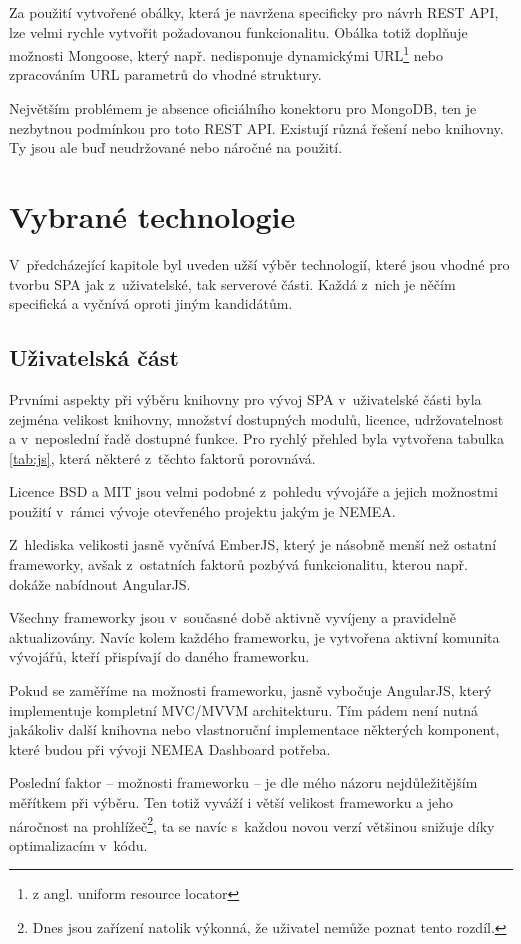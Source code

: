Za použití vytvořené obálky, která je navržena specificky pro návrh REST API, lze velmi rychle vytvořit požadovanou funkcionalitu. Obálka totiž doplňuje možnosti Mongoose, který např. nedisponuje dynamickými URL\footnote{z angl. uniform resource locator} nebo zpracováním URL parametrů do vhodné struktury.

Největším problémem je absence oficiálního konektoru pro MongoDB, ten je nezbytnou podmínkou pro toto REST API. Existují různá řešení nebo knihovny. Ty jsou ale buď neudržované nebo náročné na použití.

\section{Vybrané technologie}

V~předcházející kapitole byl uveden užší výběr technologií, které jsou vhodné pro tvorbu SPA jak z~uživatelské, tak serverové části. Každá z~nich je něčím specifická a vyčnívá oproti jiným kandidátům.

\subsection{Uživatelská část}

Prvními aspekty při výběru knihovny pro vývoj SPA v~uživatelské části byla zejména velikost knihovny, množství dostupných modulů, licence, udržovatelnost a v~neposlední řadě dostupné funkce. Pro rychlý přehled byla vytvořena tabulka \ref{tab:js}, která některé z~těchto faktorů porovnává.

Licence BSD a MIT jsou velmi podobné z~pohledu vývojáře a jejich možnostmi použití v~rámci vývoje otevřeného projektu jakým je NEMEA.

Z~hlediska velikosti jasně vyčnívá EmberJS, který je násobně menší než ostatní frameworky, avšak z~ostatních faktorů pozbývá funkcionalitu, kterou např. dokáže nabídnout AngularJS.

Všechny frameworky jsou v~současné době aktivně vyvíjeny a pravidelně aktualizovány. Navíc kolem každého frameworku, je vytvořena aktivní komunita vývojářů, kteří přispívají do daného frameworku.

Pokud se zaměříme na možnosti frameworku, jasně vybočuje AngularJS, který implementuje kompletní MVC/MVVM architekturu. Tím pádem není nutná jakákoliv další knihovna nebo vlastnoruční implementace některých komponent, které budou při vývoji NEMEA Dashboard potřeba.

Poslední faktor -- možnosti frameworku -- je dle mého názoru nejdůležitějším měřítkem při výběru. Ten totiž vyváží i větší velikost frameworku a jeho náročnost na prohlížeč\footnote{Dnes jsou zařízení natolik výkonná, že uživatel nemůže poznat tento rozdíl.}, ta se navíc s~každou novou verzí většinou snižuje díky optimalizacím v~kódu.


